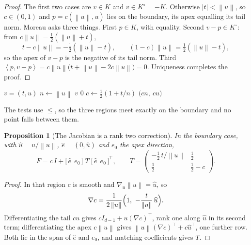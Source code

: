 \documentclass[a4paper,11pt]{book}
\theoremstyle{plain}
\newtheorem{proposition}[theorem]{Proposition}
\theoremstyle{definition}
\theoremstyle{remark}
\numberwithin{equation}{chapter}
\numberwithin{algorithm}{chapter}
\newcommand{\norm}[1]{\left\|#1\right\|}
\newcommand{\inner}[2]{\left\langle #1, #2 \right\rangle}
\begin{document}
	\begin{proof}
		The first two cases are $v\in K$ and $v\in K^{\circ}=-K$. Otherwise
		$|t|<\norm{u}$, so $c\in(0,1)$ and $p=c(\norm{u},u)$ lies on the boundary,
		its apex equalling its tail norm. Moreau asks three things. First $p\in K$,
		with equality. Second $v-p\in K^{\circ}$: from
		$c\norm{u}=\tfrac12(\norm{u}+t)$,
		\[
		t-c\norm{u}=-\tfrac12(\norm{u}-t),
		\qquad
		(1-c)\norm{u}=\tfrac12(\norm{u}-t),
		\]
		so the apex of $v-p$ is the negative of its tail norm. Third
		$\inner{p}{v-p}=c\norm{u}\bigl(t+\norm{u}-2c\norm{u}\bigr)=0$. Uniqueness
		completes the proof.
	\end{proof}

	\begin{algorithm}[H]
		\caption{Projection onto the second order cone}
		\begin{algorithmic}[1]
			\Require $v=(t,u)$
			\State $n\gets\norm{u}$
			 \State \Return $v$ 
			 \State \Return $0$ 
			\Else
			\State $c\gets\tfrac12(1+t/n)$
			\State \Return $\bigl(cn,\ cu\bigr)$
			\EndIf
		\end{algorithmic}
	\end{algorithm}

	The tests use $\leq$, so the three regions meet exactly on the boundary and no
	point falls between them.

	\begin{proposition}[The Jacobian is a rank two correction]\label{prop:socrank}
		In the boundary case, with $\widehat u=u/\norm{u}$,
		$\widehat e=(0,\widehat u)$ and $e_0$ the apex direction,
		\begin{equation}
			F=c\,I+
			\bigl[\,\widehat e\ \ e_0\,\bigr]\;T\;
			\bigl[\,\widehat e\ \ e_0\,\bigr]^{\top},
			\qquad
			T=\begin{pmatrix}
				-\tfrac12\,t/\norm{u} & \tfrac12\\[2mm]
				\tfrac12 & \tfrac12-c
			\end{pmatrix} .
		\end{equation}
	\end{proposition}

	\begin{proof}
		In that region $c$ is smooth and $\nabla_u\norm{u}=\widehat u$, so
		\[
		\nabla c=\frac{1}{2\norm{u}}
		\Bigl(1,\ -\frac{t}{\norm{u}}\,\widehat u\Bigr) .
		\]
		Differentiating the tail $cu$ gives $cI_{d-1}+u(\nabla c)^{\top}$, rank one
		along $\widehat u$ in its second term; differentiating the apex $c\norm{u}$
		gives $\norm{u}(\nabla c)^{\top}+c\widehat u^{\top}$, one further row. Both
		lie in the span of $\widehat e$ and $e_0$, and matching coefficients gives
		$T$.
	\end{proof}
\end{document}
